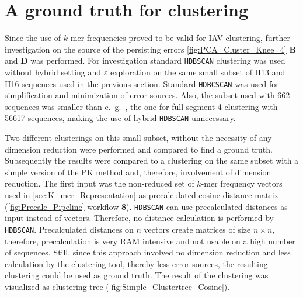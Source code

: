 \section{A ground truth for clustering} \label{sec:Comparison_Clustering}

Since the use of $k$-mer frequencies proved to be valid for \gls{IAV} clustering, further investigation on the source of the persisting errors \autoref{fig:PCA_Cluster_Knee_4} \textbf{\textsf{B}} and \textbf{\textsf{D}} was performed. For investigation standard \texttt{HDBSCAN} clustering was used without hybrid setting and $\varepsilon$ exploration on the same small subset of H13 and H16 sequences used in the previous section. Standard \texttt{HDBCSCAN} was used for simplification and minimization of error sources. Also, the subset used with 662 sequences was smaller than e.~g.~, the one for full segment 4 clustering with 56617 sequences, making the use of hybrid \texttt{HDBSCAN} unnecessary. 

\vspace{1em}

Two different clusterings on this small subset, without the necessity of any dimension reduction were performed and compared to find a ground truth. Subsequently the results were compared to a clustering on the same subset with a simple version of the PK method and, therefore, involvement of dimension reduction. The first input was the non-reduced set of $k$-mer frequency vectors used in \autoref{sec:K_mer_Representation} as precalculated cosine distance matrix (\autoref{fig:Precalc_Pipeline} workflow \textsf{\textbf{8}}). \texttt{HDBSCAN} can use precalculated distances as input instead of vectors. Therefore, no distance calculation is performed by \texttt{HDBSCAN}. Precalculated distances on $n$ vectors create matrices of size $n \times n$, therefore, precalculation is very RAM intensive and not usable on a high number of sequences. Still, since this approach involved no dimension reduction and less calculation by the clustering tool, thereby less error sources, the resulting clustering could be used as ground truth. The result of the clustering was visualized as clustering tree (\autoref{fig:Simple_Clustertree_Cosine}). 

